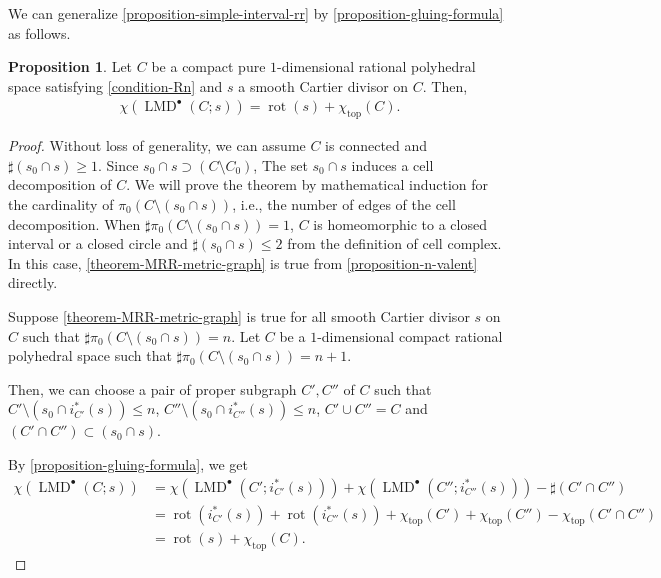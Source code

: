 \documentclass[a4paper,dvipdfmx,reqno,12pt]{amsart}
\theoremstyle{definition}
\newtheorem{proposition}[theorem]{Proposition}
\newcommand{\opn}[1]{\operatorname{#1}}
\numberwithin{equation}{section}
\begin{document}
We can generalize
\cref{proposition-simple-interval-rr} by
\cref{proposition-gluing-formula} as follows.

\begin{proposition}
\label{proposition-MRR-1-dim-poly-space}
Let $C$ be a compact pure $1$-dimensional rational 
polyhedral space satisfying \cref{condition-Rn} 
and $s$ a smooth Cartier divisor on $C$. Then,
\begin{align}
\chi(\opn{LMD}^{\bullet}(C;s))=\opn{rot}(s)+
\chi_{\opn{top}}(C).
\end{align}
\end{proposition}





\begin{proof}
Without loss of generality, we can assume $C$ is 
connected and $\sharp (s_0\cap s)\geq 1$.
Since $s_0\cap s\supset (C\setminus C_0)$, 
The set $s_0\cap s$ induces a cell decomposition of 
$C$. We will prove the theorem by mathematical 
induction for the cardinality of 
$\pi_0(C\setminus (s_0 \cap s))$, i.e., the 
number of edges of the cell decomposition.
When $\sharp\pi_0(C\setminus (s_0 \cap s))=1$, 
$C$ is homeomorphic to a closed interval 
or a closed circle and 
$\sharp (s_0\cap s)\leq 2$ 
from the definition of cell complex.
In this case, \cref{theorem-MRR-metric-graph} is 
true from \cref{proposition-n-valent} directly.

Suppose \cref{theorem-MRR-metric-graph} is true
for all smooth Cartier divisor $s$ on 
$C$ such that $\sharp \pi_0(C\setminus (s_0 \cap s))=n$.
Let $C$ be a $1$-dimensional 
compact rational polyhedral space
such that $\sharp\pi_0(C\setminus (s_0 \cap s))=n+1$.

Then, we can choose a pair of proper subgraph $C',C''$ of
$C$ such that
$C'\setminus (s_0\cap i^{*}_{C'}(s))\leq n$,
$C''\setminus (s_0\cap i^{*}_{C''}(s))\leq n$,
$C'\cup C''=C$
and $(C'\cap C'')\subset (s_0\cap s)$.

By \cref{proposition-gluing-formula}, we get 
\begin{align*}
\chi(\opn{LMD}^{\bullet}(C;s))
&=\chi(\opn{LMD}^{\bullet}(C';i_{C'}^{*}(s)))
+\chi(\opn{LMD}^{\bullet}(C'';i_{C''}^{*}(s)))
-\sharp(C'\cap C'') \\
&=\opn{rot}(i_{C'}^{*}(s))
+\opn{rot}(i_{C''}^{*}(s))
+\chi_{\opn{top}}(C')+\chi_{\opn{top}}(C'')
-\chi_{\opn{top}}(C'\cap C'') \\
&=\opn{rot}(s)+\chi_{\opn{top}}(C).
\end{align*}

\end{proof}
\end{document}

